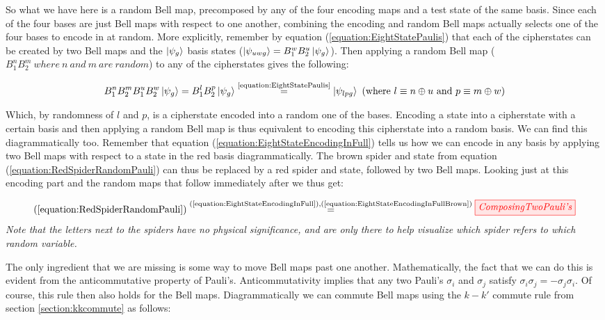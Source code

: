 \documentclass[]{article}
\newcommand{\equaltext}[1]{\ensuremath{\stackrel{\text{#1}}{=}}}
\begin{document}
So what we have here is a random Bell map, precomposed by any of the four encoding maps and a test state of the same basis. Since each of the four bases are just Bell maps with respect to one another, combining the encoding and random Bell maps actually selects one of the four bases to encode in at random. More explicitly, remember by equation (\ref{equation:EightStatePaulis}) that each of the cipherstates can be created by two Bell maps and the $\ket{\psi_g}$ basis states ($\ket{\psi_{uwg}} = B_1^w B_2^u\ket{\psi_{g}}$). Then applying a random Bell map ($B_1^n B_2^m~where~n~and~m~are~random$) to any of the cipherstates gives the following:

\begin{equation}
\label{equation:EncodingInRandomCipherstate}
B_1^nB_2^mB_1^uB_2^w\ket{\psi_{g}} = B_1^lB_2^p\ket{\psi_{g}} \equaltext{\ref{equation:EightStatePaulis}} \ket{\psi_{lpg}} ~(\text{where}~ l \equiv n \oplus u ~\text{and}~ p \equiv m \oplus w)
\end{equation}

Which, by randomness of $l$ and $p$, is a cipherstate encoded into a random one of the bases. Encoding a state into a cipherstate with a certain basis and then applying a random Bell map is thus equivalent to encoding this cipherstate into a random basis. We can find this diagrammatically too. Remember that equation (\ref{equation:EightStateEncodingInFull}) tells us how we can encode in any basis by applying two Bell maps with respect to a state in the red basis diagrammatically. The brown spider and state from equation (\ref{equation:RedSpiderRandomPauli}) can thus be replaced by a red spider and state, followed by two Bell maps. Looking just at this encoding part and the random maps that follow immediately after we thus get:

\begin{equation}
	\label{equation:composingtwopaulis} (\ref{equation:RedSpiderRandomPauli}) \equaltext{(\ref{equation:EightStateEncodingInFull}),(\ref{equation:EightStateEncodingInFullBrown})}
 \tikzfig{ComposingTwoPauli's}
\end{equation}
\textit{Note that the letters next to the spiders have no physical significance, and are only there to help visualize which spider refers to which random variable.}

The only ingredient that we are missing is some way to move Bell maps past one another. Mathematically, the fact that we can do this is evident from the anticommutative property of Pauli's. Anticommutativity implies that any two Pauli's $\sigma_i$ and $\sigma_j$ satisfy $\sigma_i\sigma_j = - \sigma_j\sigma_i$. Of course, this rule then also holds for the Bell maps. Diagrammatically we can commute Bell maps using the $k-k'$ commute rule from section \ref{section:kkcommute} as follows:
\end{document}
